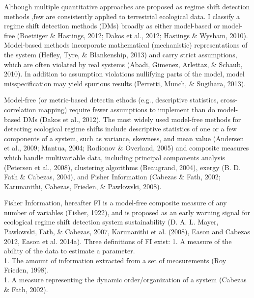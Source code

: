 \documentclass[12pt,twoside,openany]{reedthesis}
\begin{document}
Although multiple quantitative approaches are proposed as regime shift
detection methods ,few are consistently applied to terrestrial
ecological data. I classify a regime shift detection methods (DMs)
broadly as either model-based or model-free (Boettiger \& Hastings,
2012; Dakos et al., 2012; Hastings \& Wysham, 2010). Model-based methods
incorporate mathematical (mechanistic) representations of the system
(Hefley, Tyre, \& Blankenship, 2013) and carry strict assumptions, which
are often violated by real systems (Abadi, Gimenez, Arlettaz, \& Schaub,
2010). In addition to assumption violations nullifying parts of the
model, model misspecification may yield spurious results (Perretti,
Munch, \& Sugihara, 2013).

Model-free (or metric-based detectin ethods (e.g., descriptive
statistics, cross-correlation mapping) require fewer assumptions to
implement than do model-based DMs (Dakos et al., 2012). The most widely
used model-free methods for detecting ecological regime shifts include
descriptive statistics of one or a few components of a system, such as
variance, skewness, and mean value (Andersen et al., 2009; Mantua, 2004;
Rodionov \& Overland, 2005) and composite measures which handle
multivariable data, including principal components analysis (Petersen et
al., 2008), clustering algorithms (Beaugrand, 2004), exergy (B. D. Fath
\& Cabezas, 2004), and Fisher Information (Cabezas \& Fath, 2002;
Karunanithi, Cabezas, Frieden, \& Pawlowski, 2008).

Fisher Information, hereafter FI is a model-free composite measure of
any number of variables (Fisher, 1922), and is proposed as an early
warning signal for ecological regime shift detection system
sustainability (D. A. L. Mayer, Pawlowski, Fath, \& Cabezas, 2007,
Karunanithi et al. (2008), Eason and Cabezas 2012, Eason et al. 2014a).
Three definitions of FI exist: 1. A measure of the ability of the data
to estimate a parameter.\\
1. The amount of information extracted from a set of measurements (Roy
Frieden, 1998).\\
1. A measure representing the dynamic order/organization of a system
(Cabezas \& Fath, 2002).
\end{document}
